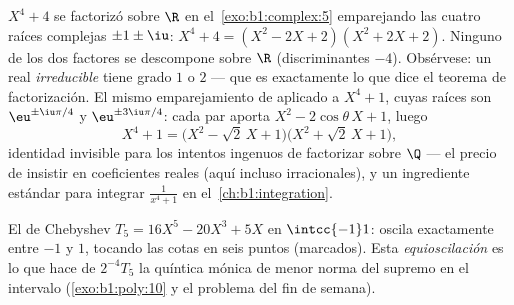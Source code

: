 \begin{example}\label{ex:b1:poly:factorexample}
$X^4 + 4$ se factorizó sobre $\R$ en el~\cref{exo:b1:complex:5}
emparejando las cuatro raíces complejas $\pm 1 \pm \iu$:
$X^4 + 4 = (X^2 - 2X + 2)(X^2 + 2X + 2)$. Ninguno de los dos factores
se descompone sobre $\R$ (discriminantes $-4$). Obsérvese: un
 real \emph{irreducible} tiene grado $1$ o $2$ --- que es
exactamente lo que dice el teorema de factorización. El mismo
emparejamiento de  aplicado a $X^4 + 1$, cuyas raíces son
$\eu^{\pm\iu\pi/4}$ y $\eu^{\pm3\iu\pi/4}$: cada par aporta $X^2 -
2\cos\theta\,X + 1$, luego
\[
X^4 + 1 = \bigl(X^2 - \sqrt2\,X + 1\bigr)
\bigl(X^2 + \sqrt2\,X + 1\bigr) ,
\]
identidad invisible para los intentos ingenuos de factorizar sobre $\Q$
--- el precio de insistir en coeficientes reales (aquí incluso
irracionales), y un ingrediente estándar para integrar
$\frac1{x^4 + 1}$ en el~\cref{ch:b1:integration}.
\end{example}

\begin{omfigure}

{\small El  de Chebyshev $T_5 = 16X^5 - 20X^3 + 5X$ en
$\intcc{-1}1$: oscila exactamente entre $-1$ y $1$, tocando las cotas
en seis puntos (marcados). Esta \emph{equioscilación} es lo que hace de
$2^{-4}T_5$ la quíntica mónica de menor norma del supremo
en el intervalo (\cref{exo:b1:poly:10} y el problema del fin de
semana).}
\end{omfigure}

